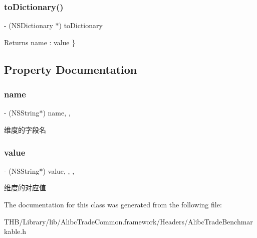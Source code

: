 \subsubsection{\texorpdfstring{to\+Dictionary()}{toDictionary()}}
{\footnotesize\ttfamily -\/ (N\+S\+Dictionary $\ast$) to\+Dictionary \begin{DoxyParamCaption}{ }\end{DoxyParamCaption}}

\begin{DoxyReturn}{Returns}
name \+: value \} 
\end{DoxyReturn}


\subsection{Property Documentation}
\mbox{\label{interface_alibc_trade_dimension_abd71d81dc6c347d8ab12e84bfcf664cb}} 
\subsubsection{\texorpdfstring{name}{name}}
{\footnotesize\ttfamily -\/ (N\+S\+String$\ast$) name\hspace{0.3cm}{\ttfamily [read]}, {\ttfamily [nonatomic]}, {\ttfamily [strong]}}

维度的字段名 \mbox{\label{interface_alibc_trade_dimension_a649215b5a333501cb80eebb6b4c9a8e7}} 
\subsubsection{\texorpdfstring{value}{value}}
{\footnotesize\ttfamily -\/ (N\+S\+String$\ast$) value\hspace{0.3cm}{\ttfamily [read]}, {\ttfamily [write]}, {\ttfamily [nonatomic]}, {\ttfamily [strong]}}

维度的对应值 

The documentation for this class was generated from the following file\+:\begin{DoxyCompactItemize}
\item 
T\+H\+B/\+Library/lib/\+Alibc\+Trade\+Common.\+framework/\+Headers/Alibc\+Trade\+Benchmarkable.\+h\end{DoxyCompactItemize}
